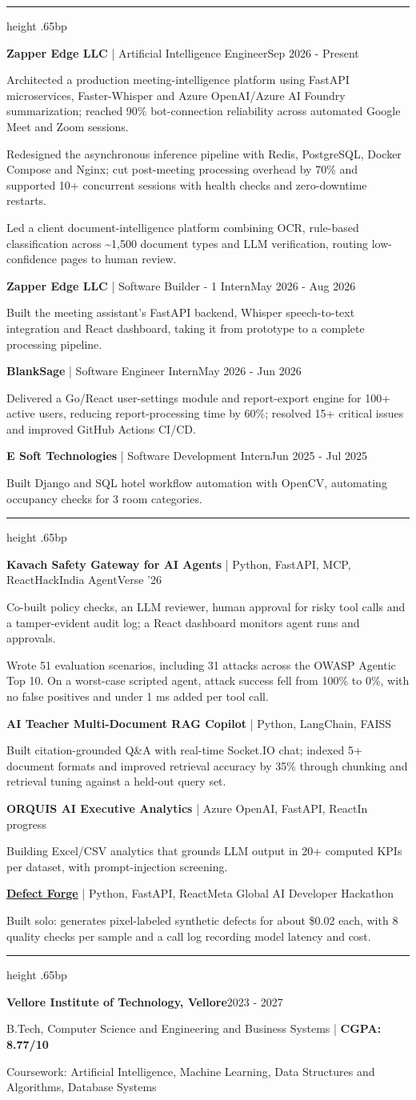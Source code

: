 \documentclass[10pt]{article}
\newcommand{\resumesection}[1]{\par\vspace{8bp}{\fontsize{11bp}{13bp}\selectfont\bfseries #1\par}\vspace{3bp}\hrule height .65bp\vspace{4bp}}
\newcommand{\entry}[2]{\par #1\hfill #2\par}
\newcommand{\nextentry}[2]{\par\vspace{5bp}\entry{#1}{#2}}
\newcommand{\bulletitem}[1]{\par\vspace{.6bp}\begingroup\hangindent=11.52bp\hangafter=1\noindent\makebox[11.52bp][l]{\textbullet}#1\par\endgroup}
\begin{document}
\resumesection{EXPERIENCE}
\entry{\textbf{Zapper Edge LLC} | Artificial Intelligence Engineer}{Sep 2026 - Present}
\bulletitem{Architected a production meeting-intelligence platform using FastAPI microservices, Faster-Whisper and Azure OpenAI/Azure AI Foundry summarization; reached 90\% bot-connection reliability across automated Google Meet and Zoom sessions.}
\bulletitem{Redesigned the asynchronous inference pipeline with Redis, PostgreSQL, Docker Compose and Nginx; cut post-meeting processing overhead by 70\% and supported 10+ concurrent sessions with health checks and zero-downtime restarts.}
\bulletitem{Led a client document-intelligence platform combining OCR, rule-based classification across \textasciitilde1,500 document types and LLM verification, routing low-confidence pages to human review.}
\nextentry{\textbf{Zapper Edge LLC} | Software Builder - 1 Intern}{May 2026 - Aug 2026}
\bulletitem{Built the meeting assistant's FastAPI backend, Whisper speech-to-text integration and React dashboard, taking it from prototype to a complete processing pipeline.}
\nextentry{\textbf{BlankSage} | Software Engineer Intern}{May 2026 - Jun 2026}
\bulletitem{Delivered a Go/React user-settings module and report-export engine for 100+ active users, reducing report-processing time by 60\%; resolved 15+ critical issues and improved GitHub Actions CI/CD.}
\nextentry{\textbf{E Soft Technologies} | Software Development Intern}{Jun 2025 - Jul 2025}
\bulletitem{Built Django and SQL hotel workflow automation with OpenCV, automating occupancy checks for 3 room categories.}

\resumesection{SELECTED AI SYSTEMS}
\entry{\textbf{Kavach Safety Gateway for AI Agents} | Python, FastAPI, MCP, React}{HackIndia AgentVerse '26}
\bulletitem{Co-built policy checks, an LLM reviewer, human approval for risky tool calls and a tamper-evident audit log; a React dashboard monitors agent runs and approvals.}
\bulletitem{Wrote 51 evaluation scenarios, including 31 attacks across the OWASP Agentic Top 10. On a worst-case scripted agent, attack success fell from 100\% to 0\%, with no false positives and under 1 ms added per tool call.}
\nextentry{\textbf{AI Teacher Multi-Document RAG Copilot} | Python, LangChain, FAISS}{}
\bulletitem{Built citation-grounded Q\&A with real-time Socket.IO chat; indexed 5+ document formats and improved retrieval accuracy by 35\% through chunking and retrieval tuning against a held-out query set.}
\nextentry{\textbf{ORQUIS AI Executive Analytics} | Azure OpenAI, FastAPI, React}{In progress}
\bulletitem{Building Excel/CSV analytics that grounds LLM output in 20+ computed KPIs per dataset, with prompt-injection screening.}
\nextentry{\href{https://github.com/Hydra-Of-Malice/defect_forge}{\textbf{Defect Forge}} | Python, FastAPI, React}{Meta Global AI Developer Hackathon}
\bulletitem{Built solo: generates pixel-labeled synthetic defects for about \$0.02 each, with 8 quality checks per sample and a call log recording model latency and cost.}

\resumesection{EDUCATION}
\entry{\textbf{Vellore Institute of Technology, Vellore}}{2023 - 2027}
B.Tech, Computer Science and Engineering and Business Systems | \textbf{CGPA: 8.77/10}\par
Coursework: Artificial Intelligence, Machine Learning, Data Structures and Algorithms, Database Systems
\end{document}
